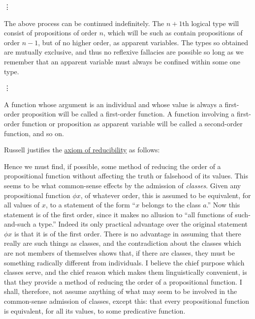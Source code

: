 \begin{remark}
\begin{thmenum}
\begin{displayquote}
      \begin{center}
        \vdots
      \end{center}

      The above process can be continued indefinitely. The \( n + 1 \)th logical type will consist of propositions of order \( n \), which will be such as contain propositions of order \( n - 1 \), but of no higher order, as apparent variables. The types so obtained are mutually exclusive, and thus no reflexive fallacies are possible so long as we remember that an apparent variable must always be confined within some one type.

      \begin{center}
        \vdots
      \end{center}

      A function whose argument is an individual and whose value is always a first-order proposition will be called a first-order function. A function involving a first-order function or proposition as apparent variable will be called a second-order function, and so on.
    \end{displayquote}

     Russell justifies the \hyperref[def:ramified_theory_of_types/reducibility]{axiom of reducibility} as follows:
    \begin{displayquote}
      Hence we must find, if possible, some method of reducing the order of a propositional function without affecting the truth or falsehood of its values. This seems to be what common-sense effects by the admission of \textit{classes}. Given any propositional function \( \phi x \), of whatever order, this is assumed to be equivalent, for all values of \( x \), to a statement of the form \enquote{\( x \) belongs to the class \( a \).} Now this statement is of the first order, since it makes no allusion to \enquote{all functions of such-and-such a type.} Indeed its only practical advantage over the original statement \( \phi x \) is that it is of the first order. There is no advantage in assuming that there really are such things as classes, and the contradiction about the classes which are not members of themselves shows that, if there are classes, they must be something radically different from individuals. I believe the chief purpose which classes serve, and the chief reason which makes them linguistically convenient, is that they provide a method of reducing the order of a propositional function. I shall, therefore, not assume anything of what may seem to be involved in the common-sense admission of classes, except this: that every propositional function is equivalent, for all its values, to some predicative function.
    \end{displayquote}


\end{thmenum}
\end{remark}
